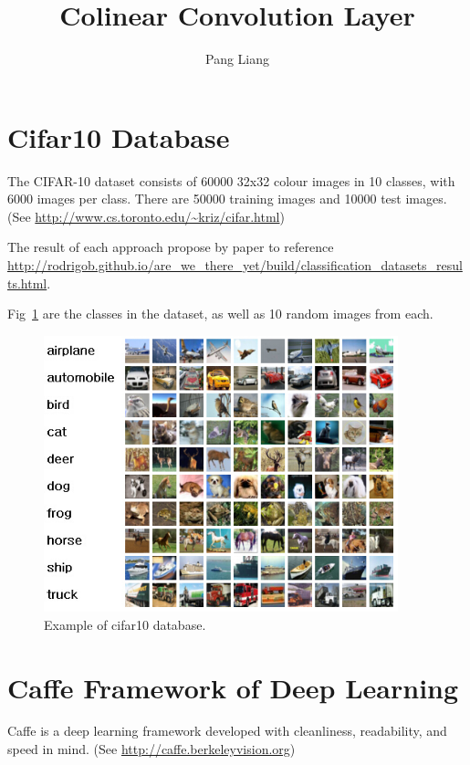 \documentclass[12pt]{article}
\title{Colinear Convolution Layer}
\author{Pang Liang}
\begin{document}
\maketitle

\section{Cifar10 Database}
The CIFAR-10 dataset consists of 60000 32x32 colour images in 10 classes, with 6000 images per class. There are 50000 training images and 10000 test images. (See \url{http://www.cs.toronto.edu/~kriz/cifar.html})

The result of each approach propose by paper to reference \url{http://rodrigob.github.io/are_we_there_yet/build/classification_datasets_results.html}.

Fig~\ref{fig:cifar10} are the classes in the dataset, as well as 10 random images from each.
\begin{figure}[!ht]
    \centering
    \includegraphics[height=8cm]{sample.jpg}
    \caption{\label{fig:cifar10} Example of cifar10 database. }
\end{figure}

\section{Caffe Framework of Deep Learning}
Caffe is a deep learning framework developed with cleanliness, readability, and speed in mind. (See \url{http://caffe.berkeleyvision.org})
\end{document}
